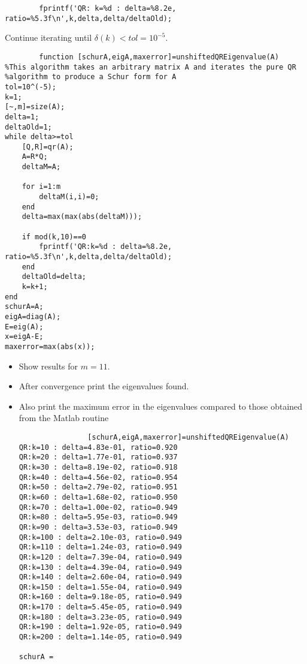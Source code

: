 \documentclass[12pt]{article}
\numberwithin{equation}{section}
\begin{document}
\begin{enumerate}
        \begin{lstlisting}
        fprintf('QR: k=%d : delta=%8.2e, ratio=%5.3f\n',k,delta,delta/deltaOld);
        \end{lstlisting}

        Continue iterating until $\delta(k)<tol=10^{-5}$.

        \begin{lstlisting}
        function [schurA,eigA,maxerror]=unshiftedQREigenvalue(A)
%This algorithm takes an arbitrary matrix A and iterates the pure QR
%algorithm to produce a Schur form for A
tol=10^(-5);
k=1;
[~,m]=size(A);
delta=1;
deltaOld=1;
while delta>=tol
    [Q,R]=qr(A);
    A=R*Q;
    deltaM=A;

    for i=1:m
        deltaM(i,i)=0;
    end
    delta=max(max(abs(deltaM)));

    if mod(k,10)==0
        fprintf('QR:k=%d : delta=%8.2e, ratio=%5.3f\n',k,delta,delta/deltaOld);
    end
    deltaOld=delta;
    k=k+1;
end
schurA=A;
eigA=diag(A);
E=eig(A);
x=eigA-E;
maxerror=max(abs(x));
\end{lstlisting}

        \begin{itemize}
            \item Show results for $m=11$.
            \item After convergence print the eigenvalues found.
            \item Also print the maximum error in the eigenvalues compared to those obtained from the Matlab routine 

                \begin{lstlisting}
                [schurA,eigA,maxerror]=unshiftedQREigenvalue(A)
QR:k=10 : delta=4.83e-01, ratio=0.920
QR:k=20 : delta=1.77e-01, ratio=0.937
QR:k=30 : delta=8.19e-02, ratio=0.918
QR:k=40 : delta=4.56e-02, ratio=0.954
QR:k=50 : delta=2.79e-02, ratio=0.951
QR:k=60 : delta=1.68e-02, ratio=0.950
QR:k=70 : delta=1.00e-02, ratio=0.949
QR:k=80 : delta=5.95e-03, ratio=0.949
QR:k=90 : delta=3.53e-03, ratio=0.949
QR:k=100 : delta=2.10e-03, ratio=0.949
QR:k=110 : delta=1.24e-03, ratio=0.949
QR:k=120 : delta=7.39e-04, ratio=0.949
QR:k=130 : delta=4.39e-04, ratio=0.949
QR:k=140 : delta=2.60e-04, ratio=0.949
QR:k=150 : delta=1.55e-04, ratio=0.949
QR:k=160 : delta=9.18e-05, ratio=0.949
QR:k=170 : delta=5.45e-05, ratio=0.949
QR:k=180 : delta=3.23e-05, ratio=0.949
QR:k=190 : delta=1.92e-05, ratio=0.949
QR:k=200 : delta=1.14e-05, ratio=0.949

schurA =


\end{lstlisting}
\end{itemize}
\end{enumerate}
\end{document}
